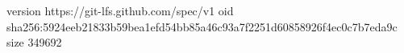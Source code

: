 version https://git-lfs.github.com/spec/v1
oid sha256:5924eeb21833b59bea1efd54bb85a46c93a7f2251d60858926f4ec0c7b7eda9c
size 349692
